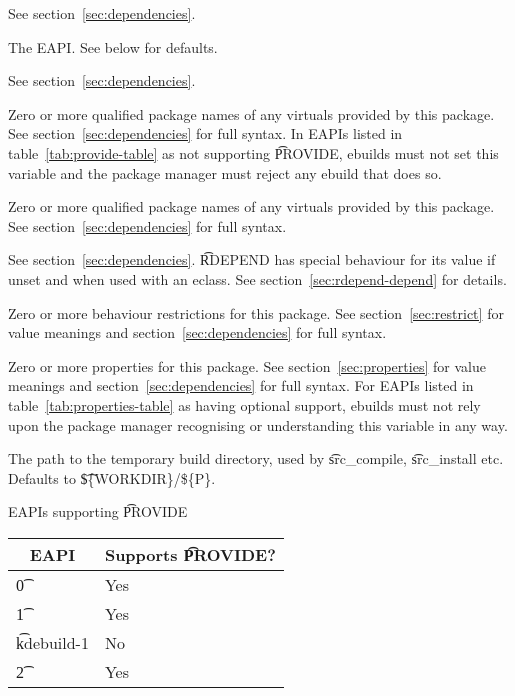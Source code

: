 \begin{description}
\item[DEPEND] See section~\ref{sec:dependencies}.
\item[EAPI] The EAPI. See below for defaults.
\item[PDEPEND] See section~\ref{sec:dependencies}.
\IFKDEBUILDELSE
{
    \item[PROVIDE] Zero or more qualified package names of any 
        virtuals provided by this package. See section~\ref{sec:dependencies} for full syntax.  In EAPIs
        listed in table~\ref{tab:provide-table} as not supporting \t{PROVIDE}, ebuilds must not set this
        variable and the package manager must reject any ebuild that does so.
        \label{ebuild-var-provide}
}{
    \item[PROVIDE] Zero or more qualified package names of any 
        virtuals provided by this package. See section~\ref{sec:dependencies} for full syntax.
        \label{ebuild-var-provide}
}
\item[RDEPEND] See section~\ref{sec:dependencies}. \t{RDEPEND} has special behaviour for its value if
    unset and when used with an eclass. See section~\ref{sec:rdepend-depend} for details.
\item[RESTRICT] Zero or more behaviour restrictions for this package. See section~\ref{sec:restrict}
    for value meanings and section~\ref{sec:dependencies} for full syntax.
\item[PROPERTIES] Zero or more properties for this package. See section~\ref{sec:properties}
    for value meanings and section~\ref{sec:dependencies} for full syntax. For EAPIs listed in
    table~\ref{tab:properties-table} as having optional support, ebuilds must not rely upon the
    package manager recognising or understanding this variable in any way.
\item[S] The path to the temporary build directory, used by \t{src\_compile}, \t{src\_install}
    etc. Defaults to \t{\$\{WORKDIR\}/\$\{P\}}.
\end{description}

\IFKDEBUILDELSE
{
    \begin{centertable}{EAPIs supporting \t{PROVIDE}} \label{tab:provide-table}
    \begin{tabular}{ l l }
        \toprule
        \multicolumn{1}{c}{\textbf{EAPI}} &
        \multicolumn{1}{c}{\textbf{Supports \t{PROVIDE}?}} \\
        \midrule
    \t{0} & Yes \\
    \t{1} & Yes \\
    \t{kdebuild-1} & No \\
    \t{2} & Yes \\
    \bottomrule
    \end{tabular}
    \end{centertable}
}{
}

